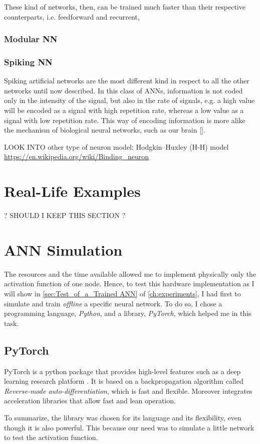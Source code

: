 These kind of networks, then, can be trained much faster than their respective counterparts, i.e. feedforward and recurrent,
\subsubsection{Modular NN}
\label{sec:Modular_NN}


\subsubsection{Spiking NN}
\label{sec:Spiking_NN}
Spiking artificial networks are the most different kind in respect to all the other networks until now described.
In this class of ANNs, information is not coded only in the intensity of the signal, but also in the rate of signals, e.g. a high value will be encoded as a signal with high repetition rate, whereas a low value as a signal with low repetition rate.
This way of encoding information is more alike the mechanism of biological neural networks, such as our brain \ref{}.

\vspace{1em}
\noindent LOOK INTO other type of neuron model: Hodgkin–Huxley (H-H) model
\url{ https://en.wikipedia.org/wiki/Binding_neuron }

\section{Real-Life Examples}
\label{sec:Real-Life_Examples}
\noindent\uppercase{\large{? Should I keep this section ?}}
\normalsize

\section{ANN Simulation}
\label{sec:ANN_Simulation}
The resources and the time available allowed me to implement physically only the activation function of one node.
Hence, to test this hardware implementation as I will show in \autoref{sec:Test_of_a_Trained ANN} of \autoref{ch:experiments}, I had first to simulate and train \textit{offline} a specific neural network.
To do so, I chose a programming language, \textit{Python}, and a library, \textit{PyTorch}, which helped me in this task.
\subsection{PyTorch}
\label{PyTorch}

PyTorch is a python package that provides high-level features such as a deep learning research platform \cite{PyTorch.org}.
It is based on a backpropagation algorithm called \textit{Reverse-mode auto-differentiation}, which is fast and flexible.
Moreover integrates acceleration libraries that allow fast and lean operation.

To summarize, the library was chosen for its language and its flexibility, even though it is also powerful.
This because our need was to simulate a little network to test the activation function.